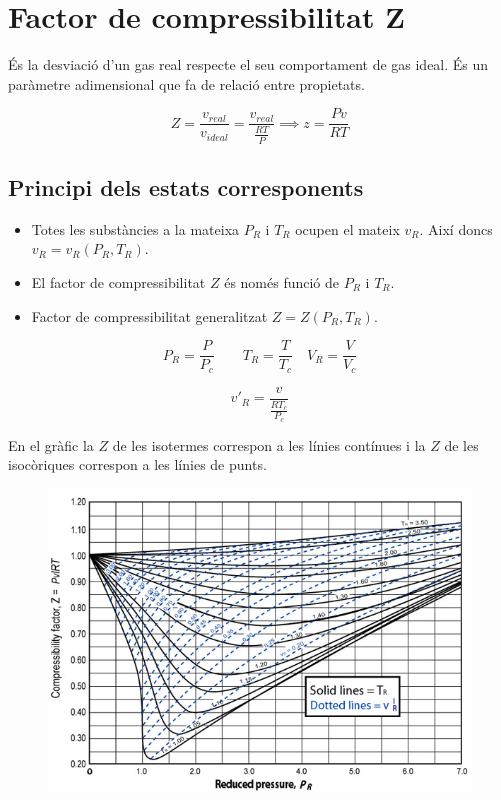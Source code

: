 \documentclass[a4paper]{article}
\begin{document}
\section{Factor de compressibilitat Z}
És la desviació d'un gas real respecte el seu comportament de gas ideal. És un paràmetre adimensional que fa de relació entre propietats.

$$
Z = \frac{v_{real}}{v_{ideal}} = \frac{v_{real}}{\frac{R T}{P}} \implies
z = \frac{P v}{R T}
$$

\subsection{Principi dels estats corresponents}
\begin{itemize}
	\item Totes les substàncies a la mateixa $P_R$ i $T_R$ ocupen el mateix $v_R$. Així doncs $v_R = v_R(P_R, T_R)$.
	\item El factor de compressibilitat $Z$ és només funció de $P_R$ i $T_R$.
	\item Factor de compressibilitat generalitzat $Z = Z(P_R, T_R)$.
\end{itemize}
\begin{equation*}
	\tag{Variables reduïdes}
	P_R = \frac{P}{P_c} \qquad
	T_R = \frac{T}{T_c} \quad
	V_R = \frac{V}{V_c}
\end{equation*}

$$
v'_R = \frac{v}{\frac{R T_c}{P_c}}
$$

En el gràfic la $Z$ de les isotermes correspon a les línies contínues i la $Z$ de les isocòriques correspon a les línies de punts.
\begin{figure}[H]
	\centering
	\includegraphics[width=\textwidth]{grafic_compressibilitat_z}
\end{figure}
\end{document}

